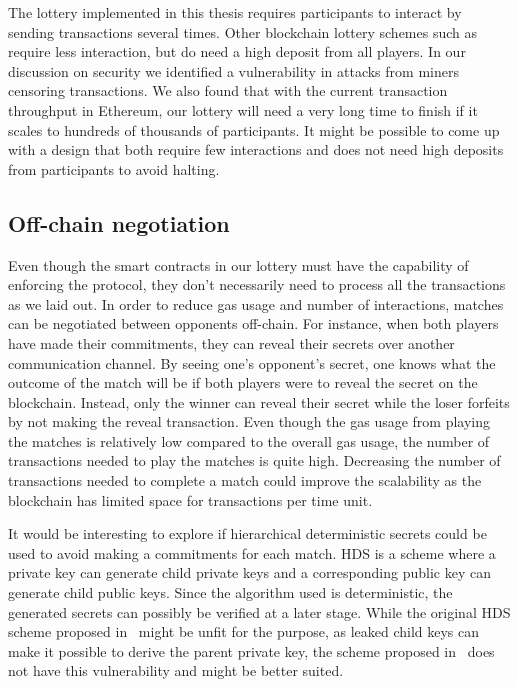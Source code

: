The lottery implemented in this thesis requires participants to interact by sending transactions several times. Other blockchain lottery schemes such as~\cite{andrychowicz_secure_2014,bentov_how_2014} require less interaction, but do need a high deposit from all players. In our discussion on security we identified a vulnerability in attacks from miners censoring transactions. We also found that with the current transaction throughput in Ethereum, our lottery will need a very long time to finish if it scales to hundreds of thousands of participants. It might be possible to come up with a design that both require few interactions and does not need high deposits from participants to avoid halting.

\subsection{Off-chain negotiation}

Even though the smart contracts in our lottery must have the capability of enforcing the protocol, they don't necessarily need to process all the transactions as we laid out. In order to reduce gas usage and number of interactions, matches can be negotiated between opponents off-chain. For instance, when both players have made their commitments, they can reveal their secrets over another communication channel. By seeing one's opponent's secret, one knows what the outcome of the match will be if both players were to reveal the secret on the blockchain. Instead, only the winner can reveal their secret while the loser forfeits by not making the reveal transaction. Even though the gas usage from playing the matches is relatively low compared to the overall gas usage, the number of transactions needed to play the matches is quite high. Decreasing the number of transactions needed to complete a match could improve the scalability as the blockchain has limited space for transactions per time unit.

It would be interesting to explore if hierarchical deterministic secrets could be used to avoid making a commitments for each match. HDS is a scheme where a private key can generate child private keys and a corresponding public key can generate child public keys. Since the algorithm used is deterministic, the generated secrets can possibly be verified at a later stage. While the original HDS scheme proposed in~\cite{wuille_bitcoin_2012} might be unfit for the purpose, as leaked child keys can make it possible to derive the parent private key, the scheme proposed in~\cite{gutoski_hierarchical_2015} does not have this vulnerability and might be better suited.

